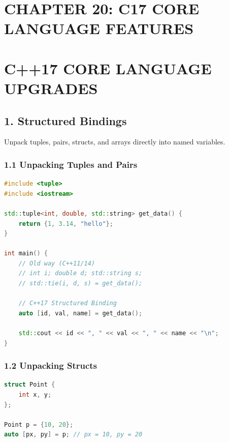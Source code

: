 \hypertarget{chapter-20-c17-core-language-features}{%
\section{CHAPTER 20: C17 CORE LANGUAGE
FEATURES}\label{chapter-20-c17-core-language-features}}

\hypertarget{c17-core-language-upgrades}{%
\section{C++17 CORE LANGUAGE
UPGRADES}\label{c17-core-language-upgrades}}

\hypertarget{structured-bindings}{%
\subsection{1. Structured Bindings}\label{structured-bindings}}

Unpack tuples, pairs, structs, and arrays directly into named variables.

\hypertarget{unpacking-tuples-and-pairs}{%
\subsubsection{1.1 Unpacking Tuples and
Pairs}\label{unpacking-tuples-and-pairs}}

\begin{lstlisting}[language={C++}]
#include <tuple>
#include <iostream>

std::tuple<int, double, std::string> get_data() {
    return {1, 3.14, "hello"};
}

int main() {
    // Old way (C++11/14)
    // int i; double d; std::string s;
    // std::tie(i, d, s) = get_data();

    // C++17 Structured Binding
    auto [id, val, name] = get_data();

    std::cout << id << ", " << val << ", " << name << "\n";
}
\end{lstlisting}

\hypertarget{unpacking-structs}{%
\subsubsection{1.2 Unpacking Structs}\label{unpacking-structs}}

\begin{lstlisting}[language={C++}]
struct Point {
    int x, y;
};

Point p = {10, 20};
auto [px, py] = p; // px = 10, py = 20
\end{lstlisting}

